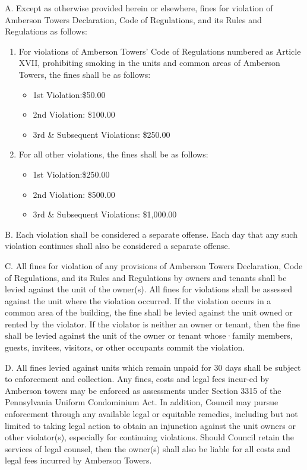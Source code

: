 \documentclass[
]{book}
\providecommand{\tightlist}{%
  \setlength{\itemsep}{0pt}\setlength{\parskip}{0pt}}
\begin{document}
A. Except as otherwise provided herein or elsewhere, fines for violation of Amberson Towers Declaration, Code of Regulations, and its Rules and Regulations as follows:

\begin{enumerate}
\def\labelenumi{\arabic{enumi}.}
\tightlist
\item
  For violations of Amberson Towers' Code of Regulations numbered as Article XVII, prohibiting smoking in the units and common areas of Amberson Towers, the fines shall be as follows:

  \begin{itemize}
  \tightlist
  \item
    1st Violation:\$50.00
  \item
    2nd Violation: \$100.00
  \item
    3rd \& Subsequent Violations: \$250.00
  \end{itemize}
\item
  For all other violations, the fines shall be as follows:

  \begin{itemize}
  \tightlist
  \item
    1st Violation:\$250.00
  \item
    2nd Violation: \$500.00
  \item
    3rd \& Subsequent Violations: \$1,000.00
  \end{itemize}
\end{enumerate}

B. Each violation shall be considered a separate offense. Each day that any such violation continues shall also be considered a separate offense.

C. All fines for violation of any provisions of Amberson Towers Declaration, Code of Regulations, and its Rules and Regulations by owners and tenants shall be levied against the unit of the owner(s). All fines for violations shall be assessed against the unit where the violation occurred. If the violation occurs in a common area of the building, the fine shall be levied against the unit owned or rented by the violator. If the violator is neither an owner or tenant, then the fine shall be levied against the unit of the owner or tenant whose·family members, guests, invitees, visitors, or other occupants commit the violation.

D. All fines levied against units which remain unpaid for 30 days shall be subject to enforcement and collection. Any fines, costs and legal fees incur-ed by Amberson towers may be enforced as assessments under Section 3315 of the Pennsylvania Uniform Condominium Act. In addition, Council may pursue enforcement through any available legal or equitable remedies, including but not limited to taking legal action to obtain an injunction against the unit owners or other violator(s), especially for continuing violations. Should Council retain the services of legal counsel, then the owner(s) shall also be liable for all costs and legal fees incurred by Amberson Towers.
\end{document}

